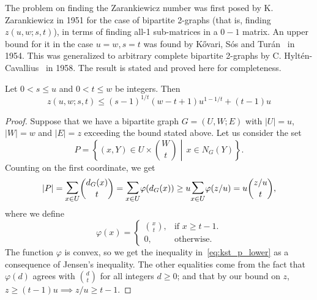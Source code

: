 The problem on finding the Zarankiewicz number was first posed by K. Zarankiewicz in 1951 for the
case of bipartite 2-graphs (that is, finding $z(u, w; s, t)$),
in terms of finding all-1 sub-matrices in a $0-1$ matrix.
An upper bound for it in the case $u=w, s=t$ was found by Kővari, Sós and Turán~\cite{Kovari1954} in 1954.
This was generalized to arbitrary complete
bipartite 2-graphs by C. Hyltén-Cavallius~\cite{Hylten1958} in 1958.
The result is stated and proved here for completeness.

\begin{theorem}\label{thm:kst}
    Let $0 < s \leq u$ and $0 < t \leq w$ be integers.
    Then 
    \[z(u, w; s, t) \leq (s - 1)^{1 / t}(w - t + 1)u^{1 - 1 / t} + (t - 1)u\]
    \begin{proof}
        Suppose that we have a bipartite graph $G = (U, W; E)$
        with $|U| = u$, $|W| = w$ and $|E| = z$ exceeding the bound stated above.
        Let us consider the set
        \[
            P = \left\{ (x, Y) \in U \times \binom{W}{t}
            \middle\vert\, x \in N_G(Y) \right\}.
        \]
        Counting on the first coordinate, we get
        \begin{equation} \label{eq:kst_p_lower}
            |P| =
            \mathlarger{\mathlarger{\sum}}_{x \in U} \binom{d_G(x)}{t} =
            \mathlarger{\mathlarger{\sum}}_{x \in U} \varphi(d_G(x)) \geq
            u  \mathlarger{\mathlarger{\sum}}_{x \in U} \varphi(z/u) =
            u \binom{z / u}{t},
        \end{equation}
        where we define
        \[
            \varphi(x) =
            \begin{cases}
                \binom{x}{t}, & \text{if } x \geq t - 1. \\
                0, & \text{otherwise.}
            \end{cases}
        \]
        The function $\varphi$ is convex, so we get the inequality in~\eqref{eq:kst_p_lower}
        as a consequence of Jensen's inequality.
        The other equalities come from the fact that $\varphi(d)$ agrees
        with $\binom{d}{t}$ for all integers $d \geq 0$;
        and that by our bound on $z$, $z \geq (t-1)u \implies z/u \geq t - 1$.


\end{proof}
\end{theorem}
